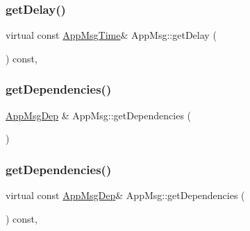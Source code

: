 \mbox{\label{class_app_msg_ac735d5e96a9c7fe0281d617820d7b533}} 
\subsubsection{\texorpdfstring{get\+Delay()}{getDelay()}\hspace{0.1cm}{\footnotesize\ttfamily [2/2]}}
{\footnotesize\ttfamily virtual const \hyperlink{_app_msg__m_8h_afd955b091e7d9b98cff80a090db1eb09}{App\+Msg\+Time}\& App\+Msg\+::get\+Delay (\begin{DoxyParamCaption}{ }\end{DoxyParamCaption}) const\hspace{0.3cm}{\ttfamily [inline]}, {\ttfamily [virtual]}}

\mbox{\label{class_app_msg_ae767d2a50a7b279bdecf457fd047125a}} 
\subsubsection{\texorpdfstring{get\+Dependencies()}{getDependencies()}\hspace{0.1cm}{\footnotesize\ttfamily [1/2]}}
{\footnotesize\ttfamily \hyperlink{_app_msg__m_8h_a39bb58326d7e24febcd7397c022ada6a}{App\+Msg\+Dep} \& App\+Msg\+::get\+Dependencies (\begin{DoxyParamCaption}{ }\end{DoxyParamCaption})\hspace{0.3cm}{\ttfamily [virtual]}}

\mbox{\label{class_app_msg_a453ca3d6502f7f82020c7ef2787a45c7}} 
\subsubsection{\texorpdfstring{get\+Dependencies()}{getDependencies()}\hspace{0.1cm}{\footnotesize\ttfamily [2/2]}}
{\footnotesize\ttfamily virtual const \hyperlink{_app_msg__m_8h_a39bb58326d7e24febcd7397c022ada6a}{App\+Msg\+Dep}\& App\+Msg\+::get\+Dependencies (\begin{DoxyParamCaption}{ }\end{DoxyParamCaption}) const\hspace{0.3cm}{\ttfamily [inline]}, {\ttfamily [virtual]}}

